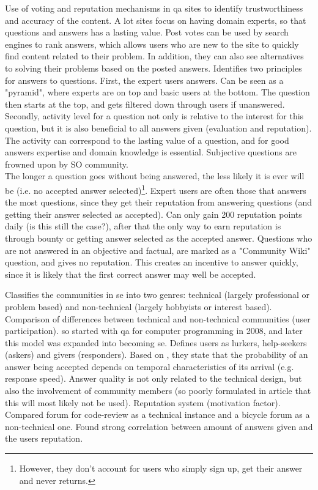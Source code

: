 Use of voting and reputation mechanisms in \gls{qa} sites to identify trustworthiness and accuracy of the content.
A lot sites focus on having domain experts, so that questions and answers has a lasting value. 
Post votes can be used by search engines to rank answers, which allows users who are new to the site to quickly find content related to their problem.
In addition, they can also see alternatives to solving their problems based on the posted answers.
Identifies two principles for answers to questions. First, the expert users answers. Can be seen as a "pyramid", where experts are on top and basic users at the bottom. 
The question then starts at the top, and gets filtered down through users if unanswered. 
Secondly, activity level for a question not only is relative to the interest for this question, but it is also beneficial to all answers given (evaluation and reputation).
The activity can correspond to the lasting value of a question, and for good answers expertise and domain knowledge is essential. 
Subjective questions are frowned upon by SO community. \\
The longer a question goes without being answered, the less likely it is ever will be (i.e. no accepted answer selected)\footnote{
	However, they don't account for users who simply sign up, get their answer and never returns.
}. 
Expert users are often those that answers the most questions, since they get their reputation from answering questions (and getting their answer selected as accepted). 
Can only gain 200 reputation points daily (is this still the case?), after that the only way to earn reputation is through bounty or getting answer selected as the accepted answer.
Questions who are not answered in an objective and factual, are marked as a "Community Wiki" question, and gives no reputation.
This creates an incentive to answer quickly, since it is likely that the first correct answer may well be accepted.
\cite{Anderson2012}




Classifies the communities in \gls{se} into two genres: technical (largely professional or problem based) and non-technical (largely hobbyists or interest based).
Comparison of differences between technical and non-technical communities (user participation).
\gls{so} started with \gls{qa} for computer programming in 2008, and later this model was expanded into becoming \gls{se}.
Defines users as lurkers, help-seekers (askers) and givers (responders).
Based on \cite{Anderson2012}, they state that the probability of an answer being accepted depends on temporal characteristics of its arrival (e.g. response speed).
Answer quality is not only related to the technical design, but also the involvement of community members (so poorly formulated in article that this will most likely not be used). 
Reputation system (motivation factor). 
Compared forum for code-review as a technical instance and a bicycle forum as a non-technical one. 
Found strong correlation between amount of answers given and the users reputation.
\cite{Ahmed2015}




